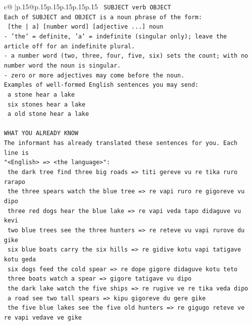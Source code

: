 \documentclass{article}
\begin{document}
{\begin{supertabular}{c@{$\;$}|p{.15\linewidth}@{}p{.15\linewidth}p{.15\linewidth}p{.15\linewidth}p{.15\linewidth}p{.15\linewidth}}
{{{\texttt{    SUBJECT  verb  OBJECT} \\
\texttt{Each of SUBJECT and OBJECT is a noun phrase of the form:} \\
\texttt{    {[}the | a{]}  {[}number word{]}  {[}adjective ...{]}  noun} \\
\texttt{{-} 'the' = definite, 'a' = indefinite (singular only); leave the article off for an indefinite plural.} \\
\texttt{{-} a number word (two, three, four, five, six) sets the count; with no number word the noun is singular.} \\
\texttt{{-} zero or more adjectives may come before the noun.} \\
\texttt{Examples of well{-}formed English sentences you may send:} \\
\texttt{    a stone hear a lake} \\
\texttt{    six stones hear a lake} \\
\texttt{    a old stone hear a lake} \\
\\ 
\texttt{WHAT YOU ALREADY KNOW} \\
\texttt{The informant has already translated these sentences for you. Each line is} \\
\texttt{"<English>  =>  <the language>":} \\
\texttt{    the dark tree find three big roads  =>  titi gereve vu re tika ruro rarapo} \\
\texttt{    the three spears watch the blue tree  =>  re vapi ruro re gigoreve vu dipo} \\
\texttt{    three red dogs hear the blue lake  =>  re vapi veda tapo didaguve vu kevi} \\
\texttt{    two blue trees see the three hunters  =>  re reteve vu vapi rurove du gike} \\
\texttt{    six blue boats carry the six hills  =>  re gidive kotu vapi tatigave kotu geda} \\
\texttt{    six dogs feed the cold spear  =>  re dope gigore didaguve kotu teto} \\
\texttt{    three boats watch a spear  =>  gigore tatigave vu dipo} \\
\texttt{    the dark lake watch the five ships  =>  re rugive ve re tika veda dipo} \\
\texttt{    a road see two tall spears  =>  kipu gigoreve du gere gike} \\
\texttt{    the five blue lakes see the five old hunters  =>  re gigugo reteve ve re vapi vedave ve gike} \\
}}}
\end{supertabular}}
\end{document}
